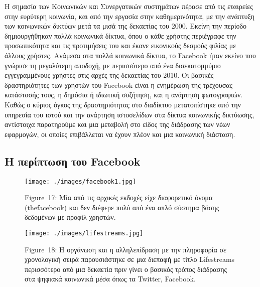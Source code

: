 \documentclass[
]{article}
\begin{document}
Η σημασία των Κοινωνικών και Συνεργατικών συστημάτων πέρασε από τις
εταιρείες στην ευρύτερη κοινωνία, και από την εργασία στην
καθημερινότητα, με την ανάπτυξη των κοινωνικών δικτύων μετά τα μισά της
δεκαετίας του 2000. Εκείνη την περίοδο δημιουργήθηκαν πολλά κοινωνικά
δίκτυα, όπου ο κάθε χρήστης περιέγραφε την προσωπικότητα και τις
προτιμήσεις του και έκανε εικονικούς δεσμούς φιλίας με άλλους χρήστες.
Ανάμεσα στα πολλά κοινωνικά δίκτυα, το Facebook ήταν εκείνο που γνώρισε
τη μεγαλύτερη αποδοχή, με περισσότερο από ένα δισεκατομμύριο
εγγεγραμμένους χρήστες στις αρχές της δεκαετίας του 2010. Οι βασικές
δραστηριότητες των χρηστών του Facebook είναι η ενημέρωση της τρέχουσας
κατάστασής τους, η δημόσια ή ιδιωτική συζήτηση, και η ανάρτηση
φωτογραφιών. Καθώς ο κύριος όγκος της δραστηριότητας στο διαδίκτυο
μετατοπίστηκε από την υπηρεσία του ιστού και την ανάρτηση ιστοσελίδων
στα δίκτυα κοινωνικής δικτύωσης, αντίστοιχα παρατηρούμε και μια μεταβολή
στο είδος της διάδρασης των νέων εφαρμογών, οι οποίες επιβάλλεται να
έχουν πλέον και μια κοινωνική διάσταση.

\hypertarget{ux3b7-ux3c0ux3b5ux3c1ux3afux3c0ux3c4ux3c9ux3c3ux3b7-ux3c4ux3bfux3c5-facebook}{%
\subsection{Η περίπτωση του
Facebook}\label{ux3b7-ux3c0ux3b5ux3c1ux3afux3c0ux3c4ux3c9ux3c3ux3b7-ux3c4ux3bfux3c5-facebook}}

\leavevmode{}%
\begin{figure}
\hypertarget{fig:facebook1}{%
\centering
\texttt{[image: ./images/facebook1.jpg]}
\caption{Figure~17: Μία από τις αρχικές εκδοχές είχε διαφορετικό όνομα
(thefacebook) και δεν διέφερε πολύ από ένα απλό σύστημα βάσης δεδομένων
με προφίλ χρηστών.}\label{fig:facebook1}
}
\end{figure}

\leavevmode{}%
\begin{figure}
\hypertarget{fig:lifestreams}{%
\centering
\texttt{[image: ./images/lifestreams.jpg]}
\caption{Figure~18: Η οργάνωση και η αλληλεπίδραση με την πληροφορία σε
χρονολογική σειρά παρουσιάστηκε σε μια διεπαφή με τίτλο Lifestreams
περισσότερο από μια δεκαετία πριν γίνει ο βασικός τρόπος διάδρασης στα
ψηφιακά κοινωνικά μέσα όπως τα Twitter,
Facebook.}\label{fig:lifestreams}
}
\end{figure}
\end{document}
